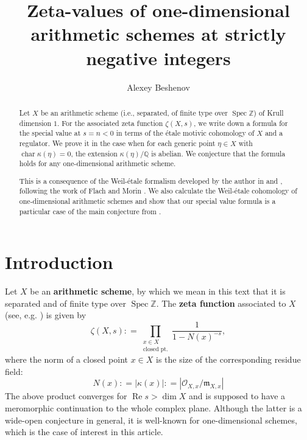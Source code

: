 \documentclass{article}
\title{Zeta-values of one-dimensional arithmetic schemes at strictly negative integers}
\author{Alexey Beshenov}
\date{}
\DeclareMathOperator{\fchar}{char}
\DeclareMathOperator{\Spec}{Spec}
\newcommand{\QQ}{\mathbb{Q}}
\newcommand{\ZZ}{\mathbb{Z}}
\renewcommand{\Re}{\operatorname{Re}}
\newcommand{\dfn}{\mathrel{\mathop:}=}
\theoremstyle{myplain}
\theoremstyle{mydefinition}
\begin{document}
\maketitle

\begin{abstract}
  Let $X$ be an arithmetic scheme (i.e., separated, of finite type over
  $\Spec \ZZ$) of Krull dimension $1$. For the associated zeta function
  $\zeta (X,s)$, we write down a formula for the special value at $s = n < 0$ in
  terms of the \'{e}tale motivic cohomology of $X$ and a regulator. We prove it
  in the case when for each generic point $\eta \in X$ with
  $\fchar \kappa (\eta) = 0$, the extension $\kappa (\eta)/\QQ$ is
  abelian. We conjecture that the formula holds for any one-dimensional
  arithmetic scheme.

  This is a consequence of the Weil-\'{e}tale formalism developed by the author
  in \cite{Beshenov-Weil-etale-1} and \cite{Beshenov-Weil-etale-2}, following
  the work of Flach and Morin \cite{Flach-Morin-2018}. We also calculate the
  Weil-\'{e}tale cohomology of one-dimensional arithmetic schemes and show that
  our special value formula is a particular case of the main conjecture from
  \cite{Beshenov-Weil-etale-2}.
\end{abstract}



\section{Introduction}

Let $X$ be an \textbf{arithmetic scheme}, by which we mean in this text that it
is separated and of finite type over $\Spec \ZZ$.  The \textbf{zeta function}
associated to $X$ (see, e.g. \cite{Serre-1965}) is given by
\[ \zeta (X,s) \dfn \prod_{\substack{x \in X \\ \text{closed pt.}}}
  \frac{1}{1 - N (x)^{-s}}, \]
where the norm of a closed point $x\in X$ is the size of the corresponding
residue field:
$$N (x) \dfn |\kappa (x)| \dfn |\mathcal{O}_{X,x}/\mathfrak{m}_{X,x}|$$
The above product converges for $\Re s > \dim X$ and is supposed to have a
meromorphic continuation to the whole complex plane. Although the latter is a
wide-open conjecture in general, it is well-known for one-dimensional schemes,
which is the case of interest in this article.
\end{document}
